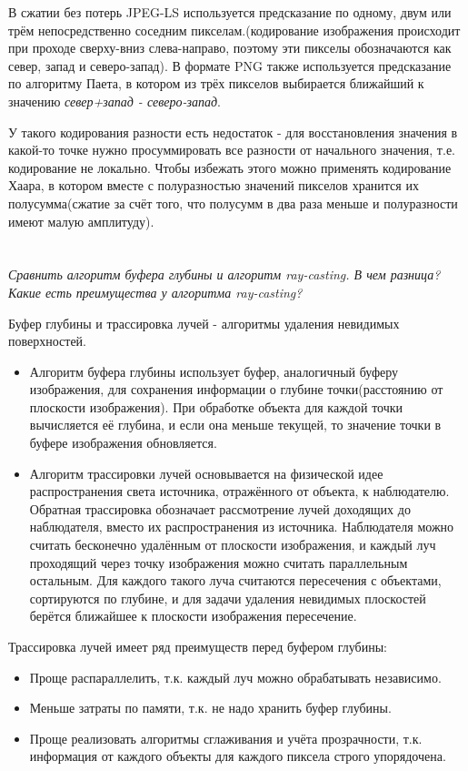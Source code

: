 \documentclass[11pt]{article}
\begin{document}
В сжатии без потерь JPEG-LS используется предсказание по одному, двум или трём непосредственно соседним пикселам.(кодирование изображения происходит при проходе сверху-вниз слева-направо, поэтому эти пикселы обозначаются как север, запад и северо-запад). В формате PNG также используется предсказание по алгоритму Паета, в котором из трёх пикселов выбирается ближайший к значению \textit{север+запад - северо-запад}.

У такого кодирования разности есть недостаток - для восстановления значения в какой-то точке нужно просуммировать все разности от начального значения, т.е. кодирование не локально. Чтобы избежать этого можно применять кодирование Хаара, в котором вместе с полуразностью значений пикселов хранится их полусумма(сжатие за счёт того, что полусумм в два раза меньше и полуразности имеют малую амплитуду).

\section{}
\textit{Сравнить алгоритм буфера глубины и алгоритм ray-casting.  В чем разница? Какие есть преимущества у алгоритма ray-casting?}

Буфер глубины и трассировка лучей - алгоритмы удаления невидимых поверхностей.

\begin{itemize}
  \item Алгоритм буфера глубины использует буфер, аналогичный буферу изображения, для сохранения информации о глубине точки(расстоянию от плоскости изображения). При обработке объекта для каждой точки вычисляется её глубина, и если она меньше текущей, то значение точки в буфере изображения обновляется.
  \item Алгоритм трассировки лучей основывается на физической идее распространения света источника, отражённого от объекта, к наблюдателю. Обратная трассировка обозначает рассмотрение лучей доходящих до наблюдателя, вместо их распространения из источника. Наблюдателя можно считать бесконечно удалённым от плоскости изображения, и каждый луч проходящий через точку изображения можно считать параллельным остальным. Для каждого такого луча считаются пересечения с объектами, сортируются по глубине, и для задачи удаления невидимых плоскостей берётся ближайшее к плоскости изображения пересечение.
\end{itemize}

Трассировка лучей имеет ряд преимуществ перед буфером глубины:
\begin{itemize}
  \item Проще распараллелить, т.к. каждый луч можно обрабатывать независимо.
  \item Меньше затраты по памяти, т.к. не надо хранить буфер глубины.
  \item Проще реализовать алгоритмы сглаживания и учёта прозрачности, т.к. информация от каждого объекты для каждого пиксела строго упорядочена.
\end{itemize}
\end{document}
